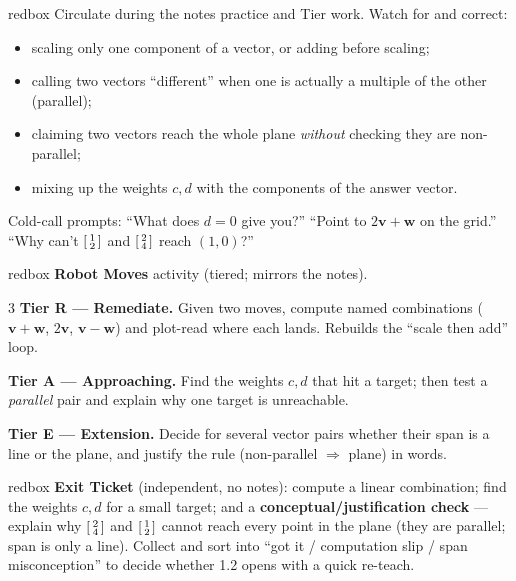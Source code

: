 \documentclass[10pt]{article}
\newcommand{\vv}{\mathbf{v}}
\newcommand{\ww}{\mathbf{w}}
\begin{document}
\begin{skillbox}{redbox}
Circulate during the notes practice and Tier work. Watch for and correct:
\begin{itemize}[leftmargin=1.2em, nosep]
  \item scaling only one component of a vector, or adding before scaling;
  \item calling two vectors ``different'' when one is actually a multiple of the other (parallel);
  \item claiming two vectors reach the whole plane \emph{without} checking they are non-parallel;
  \item mixing up the weights $c,d$ with the components of the answer vector.
\end{itemize}
Cold-call prompts: ``What does $d=0$ give you?'' ``Point to $2\vv+\ww$ on the grid.''
``Why can't $\begin{bsmallmatrix} 1\\2 \end{bsmallmatrix}$ and $\begin{bsmallmatrix} 2\\4 \end{bsmallmatrix}$
reach $(1,0)$?''
\end{skillbox}

\begin{skillbox}{redbox}
\textbf{Robot Moves} activity (tiered; mirrors the notes).
\begin{multicols}{3}
\textbf{Tier R --- Remediate.} Given two moves, compute named combinations ($\vv+\ww$, $2\vv$,
$\vv-\ww$) and plot-read where each lands. Rebuilds the ``scale then add'' loop.

\columnbreak
\textbf{Tier A --- Approaching.} Find the weights $c,d$ that hit a target; then test a
\emph{parallel} pair and explain why one target is unreachable.

\columnbreak
\textbf{Tier E --- Extension.} Decide for several vector pairs whether their span is a line or
the plane, and justify the rule (non-parallel $\Rightarrow$ plane) in words.
\end{multicols}
\end{skillbox}

\begin{skillbox}{redbox}
\textbf{Exit Ticket} (independent, no notes): compute a linear combination; find the weights
$c,d$ for a small target; and a \textbf{conceptual/justification check} --- explain why
$\begin{bsmallmatrix} 2\\4 \end{bsmallmatrix}$ and $\begin{bsmallmatrix} 1\\2 \end{bsmallmatrix}$
cannot reach every point in the plane (they are parallel; span is only a line). Collect and
sort into ``got it / computation slip / span misconception'' to decide whether 1.2 opens with
a quick re-teach.
\end{skillbox}
\end{document}
